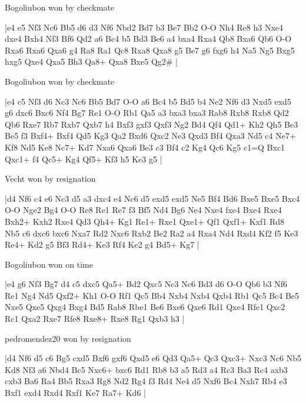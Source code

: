 \showboard

Bogoliubon won by checkmate

\makegametitle
|e4 e5 Nf3 Nc6 Bb5 d6 d3 Nf6 Nbd2 Bd7 b3 Be7 Bb2 O-O Nh4 Re8 h3 Nxe4 dxe4 Bxh4 Nf3 Bf6 Qd2 a6 Bc4 b5 Bd3 Be6 a4 bxa4 Rxa4 Qb8 Bxa6 Qb6 O-O Rxa6 Rxa6 Qxa6 g4 Ra8 Ra1 Qc8 Rxa8 Qxa8 g5 Be7 g6 fxg6 h4 Na5 Ng5 Bxg5 hxg5 Qxe4 Qxa5 Bh3 Qa8+ Qxa8 Bxe5 Qg2\#  |

\showboard

Bogoliubon won by checkmate

\makegametitle
|e4 c5 Nf3 d6 Nc3 Nc6 Bb5 Bd7 O-O a6 Bc4 b5 Bd5 b4 Ne2 Nf6 d3 Nxd5 exd5 g6 dxc6 Bxc6 Nf4 Bg7 Re1 O-O Rb1 Qa5 a3 bxa3 bxa3 Rab8 Rxb8 Rxb8 Qd2 Qb6 Rxe7 Rb7 Rxb7 Qxb7 h4 Bxf3 gxf3 Qxf3 Ng2 Bd4 Qf4 Qd1+ Kh2 Qh5 Be3 Be5 f3 Bxf4+ Bxf4 Qd5 Kg3 Qa2 Bxd6 Qxc2 Ne3 Qxd3 Bf4 Qxa3 Nd5 c4 Ne7+ Kf8 Nd5 Ke8 Nc7+ Kd7 Nxa6 Qxa6 Be3 c3 Bf4 c2 Kg4 Qc6 Kg5 c1=Q Bxc1 Qxc1+ f4 Qc5+ Kg4 Qf5+ Kf3 h5 Ke3 g5  |

\showboard

Vecht won by resignation

\makegametitle
|d4 Nf6 c4 e6 Nc3 d5 a3 dxc4 e4 Nc6 d5 exd5 exd5 Ne5 Bf4 Bd6 Bxe5 Bxe5 Bxc4 O-O Nge2 Bg4 O-O Re8 Re1 Re7 f3 Bf5 Nd4 Bg6 Ne4 Nxe4 fxe4 Bxe4 Rxe4 Bxh2+ Kxh2 Rxe4 Qd3 Qh4+ Kg1 Re1+ Rxe1 Qxe1+ Qf1 Qxf1+ Kxf1 Rd8 Nb5 c6 dxc6 bxc6 Nxa7 Rd2 Nxc6 Rxb2 Be2 Ra2 a4 Rxa4 Nd4 Rxd4 Kf2 f5 Ke3 Re4+ Kd2 g5 Bf3 Rd4+ Ke3 Rf4 Ke2 g4 Bd5+ Kg7  |

\showboard

Bogoliubon won on time

\makegametitle
|e4 g6 Nf3 Bg7 d4 c5 dxc5 Qa5+ Bd2 Qxc5 Nc3 Nc6 Bd3 d6 O-O Qb6 b3 Nf6 Re1 Ng4 Nd5 Qxf2+ Kh1 O-O Rf1 Qc5 Bb4 Nxb4 Nxb4 Qxb4 Rb1 Qc5 Bc4 Be5 Nxe5 Qxe5 Qxg4 Bxg4 Bd5 Rab8 Rbe1 Be6 Bxe6 Qxe6 Rd1 Qxe4 Rfe1 Qxc2 Rc1 Qxa2 Rxe7 Rfe8 Rxe8+ Rxe8 Rg1 Qxb3 h3  |

\showboard

pedromendez20 won by resignation

\makegametitle
|d4 Nf6 d5 c6 Bg5 cxd5 Bxf6 gxf6 Qxd5 e6 Qd3 Qa5+ Qc3 Qxc3+ Nxc3 Nc6 Nb5 Kd8 Nf3 a6 Nbd4 Bc5 Nxc6+ bxc6 Rd1 Rb8 b3 a5 Rd3 a4 Rc3 Ba3 Rc4 axb3 cxb3 Ba6 Ra4 Bb5 Rxa3 Rg8 Nd2 Rg4 f3 Rd4 Ne4 d5 Nxf6 Bc4 Nxh7 Rb4 e3 Bxf1 exd4 Rxd4 Rxf1 Ke7 Ra7+ Kd6  |

